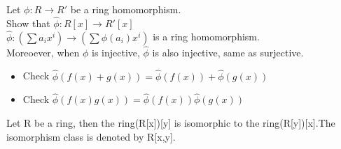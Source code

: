 \documentclass{article}
\begin{document}
\begin{theorem}
    Let $\phi: R\rightarrow R'$ be a ring homomorphism.
    \\Show that $\hat{\phi}: R[x] \rightarrow R'[x]$ 
    \\ $\hat{\phi}: (\sum a_ix^i) \rightarrow (\sum \phi(a_i)x^i)$ is a ring homomorphism.
    \\Moreoever, when $\phi$ is injective, $\hat{\phi}$ is also injective, same as surjective. 
    
\end{theorem}

\begin{Proof}
    \begin{itemize}
        \item Check  $\hat{\phi} (f(x) + g(x)) = \hat{\phi}(f(x)) +\hat{\phi}(g(x)) $ 


        
        \item Check $\hat{\phi} (f(x) g(x)) = \hat{\phi}(f(x))\hat{\phi}(g(x))$ 
    \end{itemize}

    
\end{Proof}

\begin{theorem}
    Let R be a ring, then the ring(R[x])[y] is isomorphic to the ring(R[y])[x].The isomorphism class is denoted by R[x,y].
\end{theorem}
\end{document}
